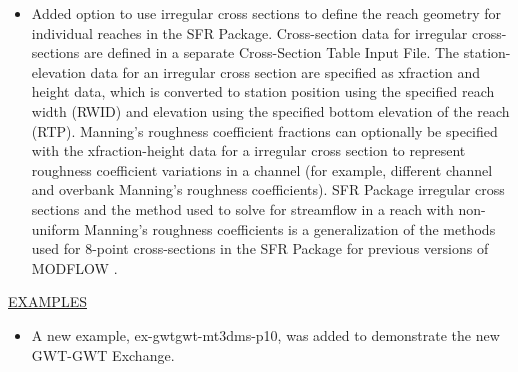 \begin{itemize}
	        \item Added option to use irregular cross sections to define the reach geometry for individual reaches in the SFR Package. Cross-section data for irregular cross-sections are defined in a separate Cross-Section Table Input File. The station-elevation data for an irregular cross section are specified as xfraction and height data, which is converted to station position using the specified reach width (RWID) and elevation using the specified bottom elevation of the reach (RTP). Manning's roughness coefficient fractions can optionally be specified with the xfraction-height data for a irregular cross section to represent roughness coefficient variations in a channel (for example, different channel and overbank Manning's roughness coefficients). SFR Package irregular cross sections and the method used to solve for streamflow in a reach with non-uniform Manning's roughness coefficients is a generalization of the methods used for 8-point cross-sections in the SFR Package for previous versions of MODFLOW \citep{modflowsfr1pack}. 
	\end{itemize}
	
	\underline{EXAMPLES}
	\begin{itemize}
	        \item A new example, ex-gwtgwt-mt3dms-p10, was added to demonstrate the new GWT-GWT Exchange.  
	\end{itemize}

